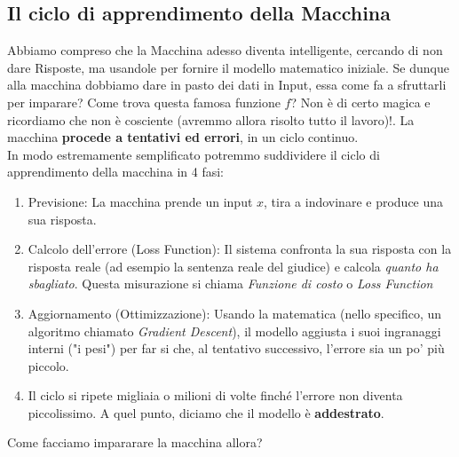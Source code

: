 \documentclass{article}
\begin{document}
\subsection{Il ciclo di apprendimento della Macchina}
Abbiamo compreso che la Macchina adesso diventa intelligente, cercando di non dare Risposte, ma usandole per fornire il modello matematico iniziale. Se dunque alla macchina dobbiamo dare in pasto dei dati in Input, essa come fa a sfruttarli per imparare? Come trova questa famosa funzione $f$? Non è di certo magica e ricordiamo che non è cosciente (avremmo allora risolto tutto il lavoro)!. La macchina \textbf{procede a tentativi ed errori}, in un ciclo continuo.\\
In modo estremamente semplificato potremmo suddividere il ciclo di apprendimento della macchina in 4 fasi:
\begin{enumerate}
    \item Previsione: La macchina prende un input $x$, tira a indovinare e produce una sua risposta.

    \item Calcolo dell'errore (Loss Function): Il sistema confronta la sua risposta con la risposta reale (ad esempio la sentenza reale del giudice) e calcola \textit{quanto ha sbagliato}. Questa misurazione si chiama \textit{Funzione di costo } o \textit{Loss Function}

    \item Aggiornamento (Ottimizzazione): Usando la matematica (nello specifico, un algoritmo chiamato \textit{Gradient Descent}), il modello aggiusta i suoi ingranaggi interni ("i pesi") per far si che, al tentativo successivo, l'errore sia un po' più piccolo.

    \item Il ciclo si ripete migliaia o milioni di volte finché l'errore non diventa piccolissimo. A quel punto, diciamo che il modello è \textbf{addestrato}.
\end{enumerate}
Come facciamo impararare la macchina allora?
\end{document}
